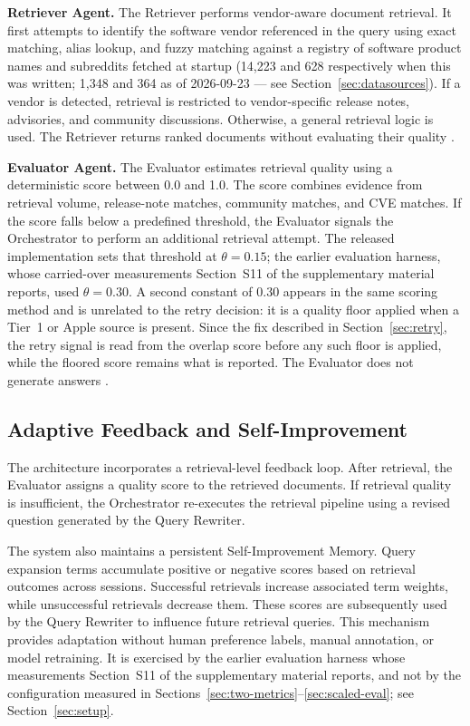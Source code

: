 \documentclass[acmsmall,review,anonymous,screen]{acmart}
\begin{document}
\textbf{Retriever Agent.}
The Retriever performs vendor-aware document retrieval. It first
attempts to identify the software vendor referenced in the query using
exact matching, alias lookup, and fuzzy matching against a registry of
software product names and subreddits fetched at startup (14,223 and 628
respectively when this was written; 1,348 and 364 as of 2026-09-23 --- see
Section~\ref{sec:datasources}). If a
vendor is detected, retrieval is restricted to vendor-specific
release notes, advisories, and community discussions. Otherwise, a
general retrieval logic is used. The Retriever returns ranked
documents without evaluating their quality \cite{guan2025, zheng2026, yang2026}.

\textbf{Evaluator Agent.}
The Evaluator estimates retrieval quality using a deterministic score
between 0.0 and 1.0. The score combines evidence from retrieval
volume, release-note matches, community matches, and CVE matches. If
the score falls below a predefined threshold, the Evaluator signals the
Orchestrator to perform an additional retrieval attempt. The released
implementation sets that threshold at $\theta = 0.15$; the earlier
evaluation harness, whose carried-over measurements
Section~S11 of the supplementary material reports, used $\theta = 0.30$. A second
constant of 0.30 appears in the same scoring method and is unrelated to the
retry decision: it is a quality floor applied when a Tier~1 or Apple source
is present. Since the fix described in Section~\ref{sec:retry}, the retry
signal is read from the overlap score before any such floor is applied, while
the floored score remains what is reported. The Evaluator does not generate
answers \cite{zhuge2024}.

\subsection{Adaptive Feedback and Self-Improvement}

The architecture incorporates a retrieval-level feedback loop. After
retrieval, the Evaluator assigns a quality score to the retrieved
documents. If retrieval quality is insufficient, the Orchestrator
re-executes the retrieval pipeline using a revised question generated by
the Query Rewriter.

The system also maintains a persistent Self-Improvement Memory. Query
expansion terms accumulate positive or negative scores based on
retrieval outcomes across sessions. Successful retrievals increase
associated term weights, while unsuccessful retrievals decrease them.
These scores are subsequently used by the Query Rewriter to influence
future retrieval queries. This mechanism provides adaptation without
human preference labels, manual annotation, or model retraining. It is
exercised by the earlier evaluation harness whose measurements
Section~S11 of the supplementary material reports, and not by the configuration measured
in Sections~\ref{sec:two-metrics}--\ref{sec:scaled-eval}; see
Section~\ref{sec:setup}.
\end{document}
